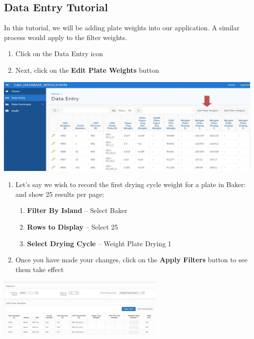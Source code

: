 \documentclass[]{book}
\providecommand{\tightlist}{%
  \setlength{\itemsep}{0pt}\setlength{\parskip}{0pt}}
\begin{document}
\hypertarget{data-entry-tutorial}{%
\subsection{Data Entry Tutorial}\label{data-entry-tutorial}}

In this tutorial, we will be adding plate weights into our application. A similar process would apply to the filter weights.

\begin{enumerate}
\def\labelenumi{\arabic{enumi}.}
\item
  Click on the Data Entry icon
\item
  Next, click on the \textbf{Edit Plate Weights} button
\end{enumerate}

\includegraphics{images/Data11.jpg}

\begin{enumerate}
\def\labelenumi{\arabic{enumi}.}
\setcounter{enumi}{2}
\item
  Let's say we wish to record the first drying cycle weight for a plate in Baker: and show 25 results per page:

  \begin{enumerate}
  \def\labelenumii{\alph{enumii})}
  \tightlist
  \item
    \textbf{Filter By Island} -- Select Baker
  \item
    \textbf{Rows to Display} -- Select 25
  \item
    \textbf{Select Drying Cycle} -- Weight Plate Drying 1
  \end{enumerate}
\item
  Once you have made your changes, click on the \textbf{Apply Filters} button to see them take effect
\end{enumerate}

\includegraphics{images/Data12.jpg}
\end{document}
